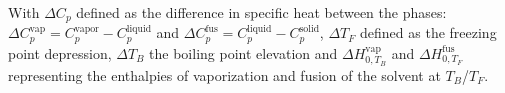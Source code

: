 With $\Delta C_p$ defined as the difference in specific heat between the
phases: $\Delta C_p^\text{vap} = C_p^\text{vapor} -%
C_p^\text{liquid}$ and $\Delta C_p^\text{fus} = C_p^\text{liquid} -%
C_p^\text{solid}$, $\Delta T_F$ defined as the freezing point depression,
$\Delta T_B$ the boiling point elevation and $\Delta H_{0,T_B}^\text{vap}$ and
$\Delta H_{0,T_F}^\text{fus}$ representing the enthalpies of vaporization and fusion
of the solvent at $T_B$/$T_F$.

